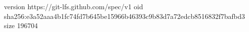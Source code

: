 version https://git-lfs.github.com/spec/v1
oid sha256:e3a52aaa4b1fc74fd7b645be15966b46393c9b83d7a72edcb8516832f7bafbd3
size 196704
